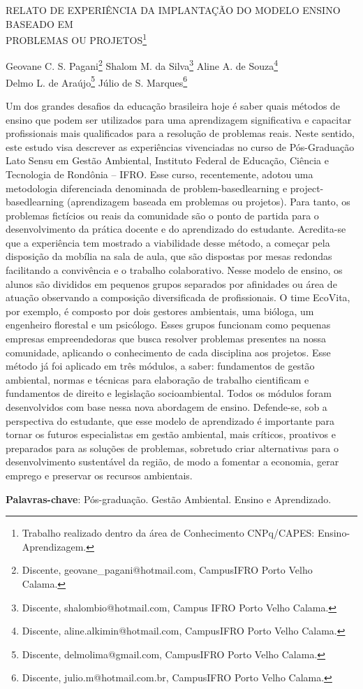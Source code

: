 \documentclass[article,12pt,onesidea,4paper,english,brazil]{abntex2}
\begin{document}
	
	
	\frenchspacing 
	
	\begin{center}
		\LARGE RELATO DE EXPERIÊNCIA DA IMPLANTAÇÃO DO MODELO ENSINO BASEADO EM \\PROBLEMAS OU PROJETOS\footnote{Trabalho realizado dentro da área de Conhecimento CNPq/CAPES: Ensino-Aprendizagem.}
		
		\normalsize
		Geovane C. S. Pagani\footnote{Discente, geovane\_pagani@hotmail.com, CampusIFRO Porto Velho Calama.} 
		Shalom M. da Silva\footnote{Discente, shalombio@hotmail.com, Campus IFRO Porto Velho Calama.} 
		Aline A. de Souza\footnote{Discente, aline.alkimin@hotmail.com, CampusIFRO Porto Velho Calama.} \\
		Delmo L. de Araújo\footnote{Discente, delmolima@gmail.com, CampusIFRO Porto Velho Calama.} 
		Júlio de S. Marques\footnote{Discente, julio.m@hotmail.com.br, CampusIFRO Porto Velho Calama.}
	\end{center}
	
	\noindent Um dos grandes desafios da educação brasileira hoje é saber quais métodos de ensino que podem ser utilizados para uma aprendizagem significativa e capacitar profissionais mais qualificados para a resolução de problemas reais. Neste sentido, este estudo visa descrever as experiências vivenciadas no curso de Pós-Graduação Lato Sensu em Gestão Ambiental, Instituto Federal de Educação, Ciência e Tecnologia de Rondônia – IFRO. Esse curso, recentemente, adotou uma metodologia diferenciada denominada de problem-basedlearning e project-basedlearning (aprendizagem baseada em problemas ou projetos). Para tanto, os problemas fictícios ou reais da comunidade são o ponto de partida para o desenvolvimento da prática docente e do aprendizado do estudante. Acredita-se que a experiência tem mostrado a viabilidade desse método, a começar pela disposição da mobília na sala de aula, que são dispostas por mesas redondas facilitando a convivência e o trabalho colaborativo. Nesse modelo de ensino, os alunos são divididos em pequenos grupos separados por afinidades ou área de atuação observando a composição diversificada de profissionais. O time EcoVita, por exemplo, é composto por dois gestores ambientais, uma bióloga, um engenheiro florestal e um psicólogo. Esses grupos funcionam como pequenas empresas empreendedoras que busca resolver problemas presentes na nossa comunidade, aplicando o conhecimento de cada disciplina aos projetos. Esse método já foi aplicado em três módulos, a saber: fundamentos de gestão ambiental, normas e técnicas para elaboração de trabalho cientificam e fundamentos de direito e legislação socioambiental. Todos os módulos foram desenvolvidos com base nessa nova abordagem de ensino. Defende-se, sob a perspectiva do estudante, que esse modelo de aprendizado é importante para tornar os futuros especialistas em gestão ambiental, mais críticos, proativos e preparados para as soluções de problemas, sobretudo criar alternativas para o desenvolvimento sustentável da região, de modo a fomentar a economia, gerar emprego e preservar os recursos ambientais.
	
	\vspace{\onelineskip}
	
	\noindent
	\textbf{Palavras-chave}: Pós-graduação. Gestão Ambiental. Ensino e Aprendizado.
	
\end{document}
